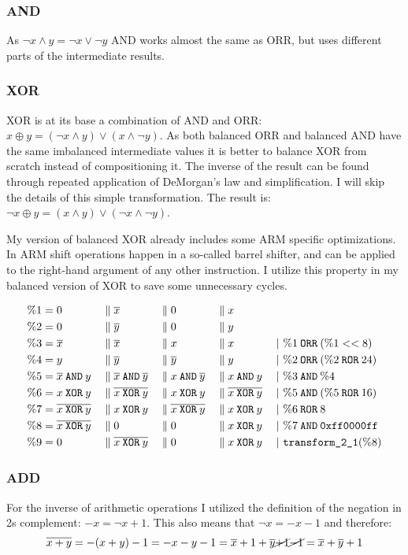 \subsubsection{AND}
As $\neg{x \land y} = \neg{x} \lor \neg{y}$ AND works almost the same as ORR, but uses different parts of the intermediate results.

\subsubsection{XOR}
XOR is at its base a combination of AND and ORR: $x \oplus y = (\neg{x} \land y) \lor (x \land \neg{y})$.
As both balanced ORR and balanced AND have the same imbalanced intermediate values it is better to balance XOR from scratch instead of compositioning it.
The inverse of the result can be found through repeated application of DeMorgan's law and simplification.
I will skip the details of this simple transformation.
The result is: $\neg{x \oplus y} = (x \land y) \lor (\neg{x} \land \neg{y})$.

My version of balanced XOR already includes some ARM specific optimizations.
In ARM shift operations happen in a so-called barrel shifter, and can be applied to the right-hand argument of any other instruction.
I utilize this property in my balanced version of XOR to save some unnecessary cycles.

\begin{align*}
  \binp{1}{0}{\neg{x}}{0}{x}\\
  \binp{2}{0}{\neg{y}}{0}{y}\\
  \btrans{3}{\neg{x}}{\neg{x}}{x}{x}{\%1 \borr (\%1 << 8)}\\
  \btrans{4}{y}{\neg{y}}{\neg{y}}{y}{\%2 \borr (\%2 \bror 24)}\\
  \btrans{5}{\neg{x} \band y}{\neg{x} \band \neg{y}}{x \band \neg{y}}{x \band y}{\%3 \band \%4}\\
  \btrans{6}{x \bxor y}{\neg{x \bxor y}}{x \bxor y}{\neg{x \bxor y}}{\%5 \band (\%5 \bror 16)}\\
  \btrans{7}{\neg{x \bxor y}}{x \bxor y}{\neg{x \bxor y}}{x \bxor y}{\%6 \bror 8}\\
  \btrans{8}{\neg{x \bxor y}}{0}{0}{x \bxor y}{\%7 \band \hex{ff0000ff}}\\
  \btrans{9}{0}{\neg{x \bxor y}}{0}{x \bxor y}{\trans21 (\%8)}
\end{align*}

\subsubsection{ADD}
For the inverse of arithmetic operations I utilized the definition of the negation in 2s complement: $-x = \neg{x} + 1$.
This also means that $\neg{x} = -x - 1$ and therefore:
\begin{equation*}
  \neg{x + y} = - (x + y) - 1 = - x - y - 1 = \neg{x} + 1 + \neg{y} \cancel{+ 1} \cancel{- 1} = \neg{x} + \neg{y} + 1
\end{equation*}

